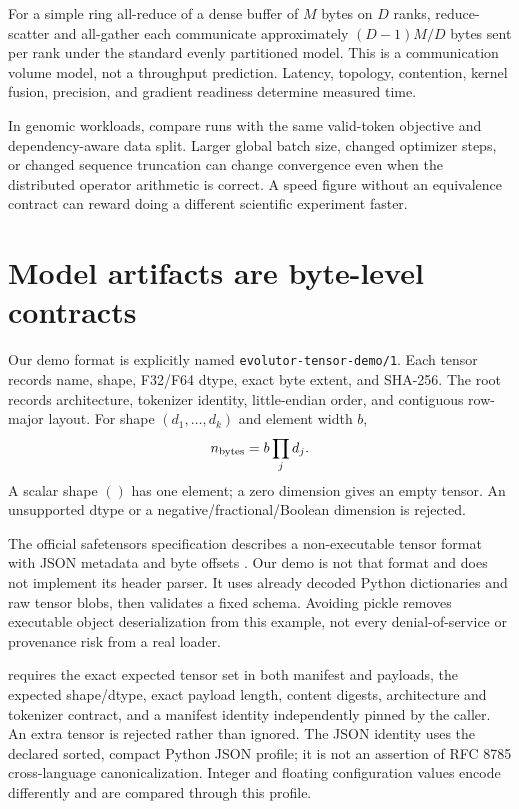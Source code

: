 For a simple ring all-reduce of a dense buffer of $M$ bytes on $D$ ranks,
reduce-scatter and all-gather each communicate approximately $(D-1)M/D$ bytes
sent per rank under the standard evenly partitioned model. This is a communication
volume model, not a throughput prediction. Latency, topology, contention,
kernel fusion, precision, and gradient readiness determine measured time.

In genomic workloads, compare runs with the same valid-token objective and
dependency-aware data split. Larger global batch size, changed optimizer steps,
or changed sequence truncation can change convergence even when the distributed
operator arithmetic is correct. A speed figure without an equivalence contract
can reward doing a different scientific experiment faster.

\section{Model artifacts are byte-level contracts}
Our demo format is explicitly named \texttt{evolutor-tensor-demo/1}.
Each tensor records name, shape, F32/F64 dtype, exact byte extent, and SHA-256.
The root records architecture, tokenizer identity, little-endian order, and
contiguous row-major layout. For shape $(d_1,\ldots,d_k)$ and element width $b$,
\[
n_{\rm bytes}=b\prod_jd_j.
\]
A scalar shape $()$ has one element; a zero dimension gives an empty tensor.
An unsupported dtype or a negative/fractional/Boolean dimension is rejected.

The official safetensors specification describes a non-executable tensor format
with JSON metadata and byte offsets \cite{safetensors-format}. Our demo is not
that format and does not implement its header parser. It uses already decoded
Python dictionaries and raw tensor blobs, then validates a fixed schema.
Avoiding pickle removes executable object deserialization from this example,
not every denial-of-service or provenance risk from a real loader.

 requires the exact expected tensor set in both manifest and payloads,
the expected shape/dtype, exact payload length, content digests, architecture and
tokenizer contract, and a manifest identity independently pinned by the caller.
An extra tensor is rejected rather than ignored. The JSON identity uses the
declared sorted, compact Python JSON profile; it is not an assertion of
RFC 8785 cross-language canonicalization. Integer and floating configuration
values encode differently and are compared through this profile.

